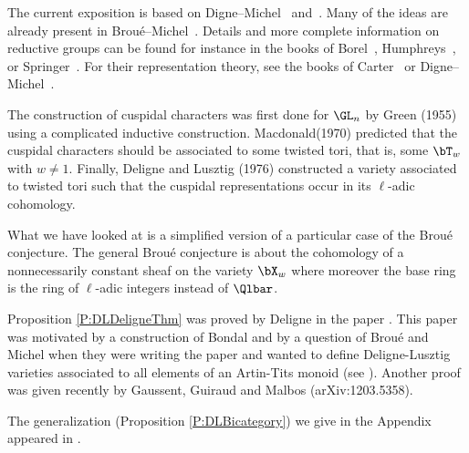 The current exposition is based on Digne--Michel~\cite{DiMBook} and~\cite{DiMDel}. Many of the ideas are already present in Brou\'e--Michel~\cite{BrMi}. Details and more complete information on reductive groups can be found for instance in the books of Borel~\cite{borel}, Humphreys~\cite{humphreys}, or Springer~\cite{springer}. For their representation theory, see the books of Carter~\cite{carter} or Digne--Michel~\cite{DiMBook}. 

The construction of cuspidal characters was first done  for $\GL_n$ by Green (1955) using a complicated inductive construction. Macdonald(1970) predicted that the cuspidal characters should be associated to some twisted tori, that is, some $\bT_w$ with $w\ne 1$. Finally, Deligne and Lusztig (1976) constructed a variety associated to twisted tori such that the cuspidal representations occur in its $\ell$-adic cohomology.

What we have looked at is a simplified version of  a particular case of the
Brou\'e conjecture. The general Brou\'e conjecture is about the cohomology of a nonnecessarily constant sheaf on the variety $\bX_w$ where moreover the base ring is the ring of $\ell$-adic integers instead of $\Qlbar$. 

Proposition \ref{P:DLDeligneThm}
was proved by Deligne in the paper \cite{Deligne}. This paper was
motivated by a construction of Bondal
and by a question of Brou\'e and Michel when they were writing the paper
\cite{BrMi} and wanted to define Deligne-Lusztig varieties associated to all
elements of an Artin-Tits monoid (see \cite[1.6]{BrMi}).
Another proof was given recently by Gaussent, Guiraud and Malbos
(arXiv:1203.5358).

The generalization (Proposition \ref{P:DLBicategory})
we give in the Appendix appeared in \cite{DiMPar}.

